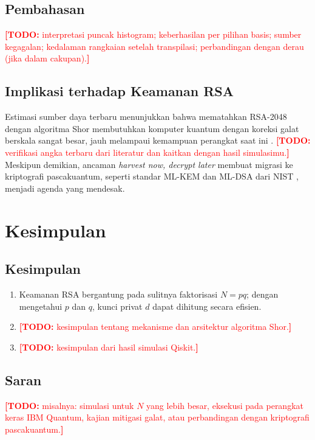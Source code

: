 \documentclass[11pt,a4paper]{article}
\newcommand{\todo}[1]{\textcolor{red}{\textbf{[TODO:} #1\textbf{]}}}
\begin{document}
\subsection{Pembahasan}
\todo{interpretasi puncak histogram; keberhasilan per pilihan basis;
sumber kegagalan; kedalaman rangkaian setelah transpilasi; perbandingan
dengan derau (jika dalam cakupan).}

\subsection{Implikasi terhadap Keamanan RSA}
Estimasi sumber daya terbaru menunjukkan bahwa mematahkan RSA-2048 dengan
algoritma Shor membutuhkan komputer kuantum dengan koreksi galat berskala
sangat besar, jauh melampaui kemampuan perangkat saat ini
\cite{gidney2025}. \todo{verifikasi angka terbaru dari literatur dan
kaitkan dengan hasil simulasimu.} Meskipun demikian, ancaman
\emph{harvest now, decrypt later} membuat migrasi ke kriptografi
pascakuantum, seperti standar ML-KEM dan ML-DSA dari NIST \cite{nist_pqc},
menjadi agenda yang mendesak.

\section{Kesimpulan}\label{sec:kesimpulan}

\subsection{Kesimpulan}
\begin{enumerate}[label=\arabic*.]
  \item Keamanan RSA bergantung pada sulitnya faktorisasi $N = pq$; dengan
        mengetahui $p$ dan $q$, kunci privat $d$ dapat dihitung secara
        efisien.
  \item \todo{kesimpulan tentang mekanisme dan arsitektur algoritma Shor.}
  \item \todo{kesimpulan dari hasil simulasi Qiskit.}
\end{enumerate}

\subsection{Saran}
\todo{misalnya: simulasi untuk $N$ yang lebih besar, eksekusi pada perangkat
keras IBM Quantum, kajian mitigasi galat, atau perbandingan dengan
kriptografi pascakuantum.}
\end{document}

